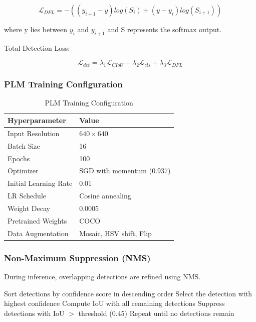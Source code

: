 \documentclass[runningheads]{llncs}
\begin{document}
\begin{equation}
\mathcal{L}_{DFL}=-((y_{i+1}-y)log(S_{i})+(y-y_{i})log(S_{i+1}))
\end{equation}

where y lies between $y_{i}$ and $y_{i+1}$ and S represents the softmax output.

\noindent Total Detection Loss:

\begin{equation}
\mathcal{L}_{det}=\lambda_{1}\mathcal{L}_{CIoU}+\lambda_{2}\mathcal{L}_{cls}+\lambda_{3}\mathcal{L}_{DFL}
\end{equation}

\subsubsection{PLM Training Configuration}
\begin{table}[H]
\caption{PLM Training Configuration}
\label{tab:plm_config}
\centering
\begin{tabular}{ll}
\toprule
\textbf{Hyperparameter} & \textbf{Value} \\
\midrule
Input Resolution & $640\times640$ \\
Batch Size & 16 \\
Epochs & 100 \\
Optimizer & SGD with momentum (0.937) \\
Initial Learning Rate & 0.01 \\
LR Schedule & Cosine annealing \\
Weight Decay & 0.0005 \\
Pretrained Weights & COCO \\
Data Augmentation & Mosaic, HSV shift, Flip \\
\bottomrule
\end{tabular}
\end{table}

\subsubsection{Non-Maximum Suppression (NMS)}
During inference, overlapping detections are refined using NMS.

\begin{algorithm}[H]
\caption{Non-Maximum Suppression (NMS)}
\label{alg:nms}
\begin{algorithmic}[1]
\STATE Sort detections by confidence score in descending order
\STATE Select the detection with highest confidence
\STATE Compute IoU with all remaining detections
\STATE Suppress detections with IoU $>$ threshold (0.45)
\STATE Repeat until no detections remain
\end{algorithmic}
\end{algorithm}
\end{document}
